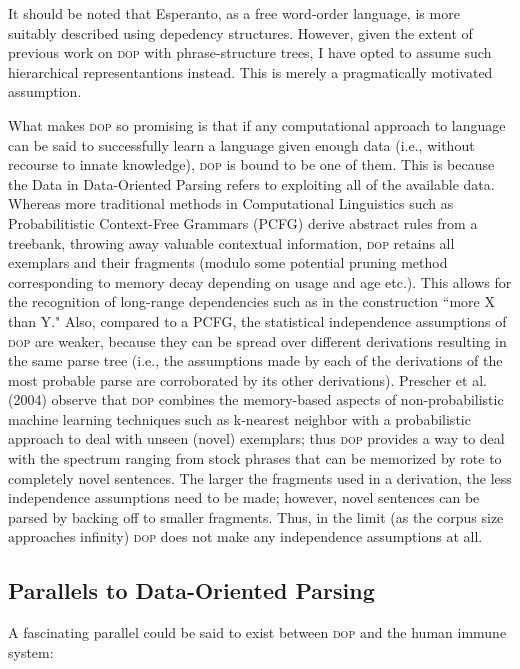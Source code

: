\documentclass[10pt,a4paper]{article}
\begin{document}
It should be noted that Esperanto, as a free word-order language, is more
suitably described using depedency structures. However, given the extent of
previous work on \textsc{dop} with phrase-structure trees, I have opted to assume such
hierarchical representantions instead. This is merely a pragmatically motivated
assumption. 

What makes \textsc{dop} so promising is that if any computational approach to language
can be said to successfully learn a language given enough data (i.e., without
recourse to innate knowledge), \textsc{dop} is bound to be one of them.  This is because
the Data in Data-Oriented Parsing refers to exploiting all of the available
data. Whereas more traditional methods in Computational Linguistics such as
Probabilitistic Context-Free Grammars (PCFG) derive abstract rules from a
treebank, throwing away valuable contextual information, \textsc{dop} retains all
exemplars and their fragments (modulo some potential pruning method
corresponding to memory decay depending on usage and age etc.). This allows for
the recognition of long-range dependencies such as in the construction ``more X
than Y." Also, compared to a PCFG, the statistical independence assumptions of
\textsc{dop} are weaker, because they can be spread over different derivations
resulting in the same parse tree (i.e., the assumptions made by each of the
derivations of the most probable parse are corroborated by its other
derivations). Prescher et al. (2004) observe that \textsc{dop} combines the memory-based
aspects of non-probabilistic machine learning techniques such as k-nearest
neighbor with a probabilistic approach to deal with unseen (novel) exemplars;
thus \textsc{dop} provides a way to deal with the spectrum ranging from stock phrases
that can be memorized by rote to completely novel sentences. The larger the
fragments used in a derivation, the less independence assumptions need to be
made; however, novel sentences can be parsed by backing off to smaller
fragments. Thus, in the limit (as the corpus size approaches infinity) \textsc{dop} does
not make any independence assumptions at all. 

\subsection{Parallels to Data-Oriented Parsing}

A fascinating parallel could be said to exist between \textsc{dop} and the human immune
system:
\end{document}
